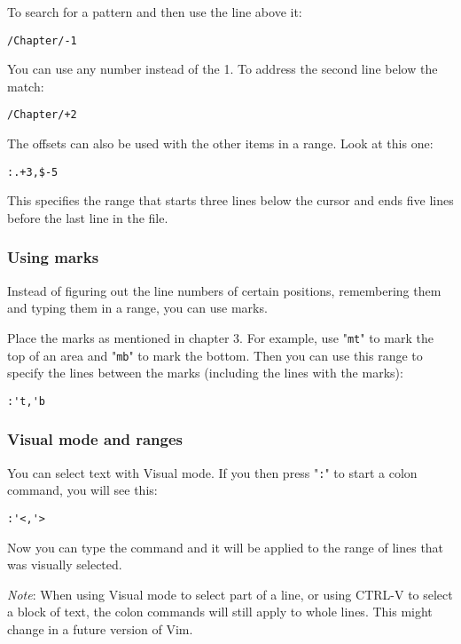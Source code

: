 {To search for a pattern and then use the line above it:

\begin{Verbatim}[samepage=true]
 /Chapter/-1
\end{Verbatim}

You can use any number instead of the 1.
To address the second line below the match:

\begin{Verbatim}[samepage=true]
 /Chapter/+2
\end{Verbatim}

The offsets can also be used with the other items in a range.
Look at this one:

\begin{Verbatim}[samepage=true]
 :.+3,$-5
\end{Verbatim}

This specifies the range that starts three lines below the cursor and ends five lines before the last line in the file.
\subsubsection{Using marks}
Instead of figuring out the line numbers of certain positions, remembering them and typing them in a range, you can use marks.

Place the marks as mentioned in chapter 3.
For example, use "\texttt{mt}" to mark the top of an area and "\texttt{mb}" to mark the bottom.
Then you can use this range to specify the lines between the marks (including the lines with the marks):

\begin{Verbatim}[samepage=true]
 :'t,'b
\end{Verbatim}
\subsubsection{Visual mode and ranges}
You can select text with Visual mode.
If you then press "\texttt{:}" to start a colon command, you will see this:

\begin{Verbatim}[samepage=true]
 :'<,'>
\end{Verbatim}

Now you can type the command and it will be applied to the range of lines that was visually selected.

\emph{Note}:
When using Visual mode to select part of a line, or using CTRL-V to select a block of text, the colon commands will still apply to whole lines.
This might change in a future version of Vim.

}
